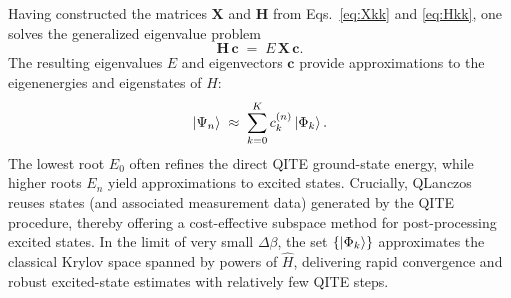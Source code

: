 \documentclass[aip,jcp,amsmath,amssymb, reprint]{revtex4-1}
\begin{document}
Having constructed the matrices $\mathbf{X}$ and $\mathbf{H}$ from Eqs.~\eqref{eq:Xkk} and \eqref{eq:Hkk}, one solves the generalized eigenvalue problem
\begin{equation}
\mathbf{H}\,\mathbf{c} 
\;=\;
E\,\mathbf{X}\,\mathbf{c}.
\end{equation}
The resulting eigenvalues $E$ and eigenvectors $\mathbf{c}$ provide approximations to the eigenenergies and eigenstates of $\hat{H}$:
\begin{equation}
\ket{\Psi_n} 
\;\approx\;
\sum_{k=0}^{K}
c_{k}^{(n)}
\ket{\Phi_k}.
\end{equation}
The lowest root $E_0$ often refines the direct QITE ground-state energy, while higher roots $E_n$ yield approximations to excited states. Crucially, QLanczos reuses states (and associated measurement data) generated by the QITE procedure, thereby offering a cost-effective subspace method for post-processing excited states. In the limit of very small $\Delta \beta$, the set $\{\ket{\Phi_k}\}$ approximates the classical Krylov space spanned by powers of $\hat{H}$, delivering rapid convergence and robust excited-state estimates with relatively few QITE steps.


%
\end{document}
